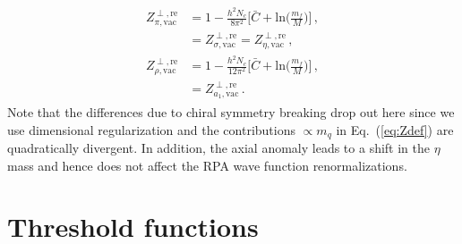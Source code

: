 \documentclass[reprint,english,superscriptaddress,preprintnumbers,amsmath,amssymb,aps,prd]{revtex4-2}
\def\Eq#1{Eq.~(\ref{#1})}
\begin{document}
%
\begin{align}
\begin{split}
Z^{\perp,\mathrm{re}}_{\pi,\mathrm{vac}}&=1-\frac{h^2N_c}{8\pi^2}\bigg[\bar{C}+\mathrm{ln}\Big(\frac{m_f}{M}\Big)\bigg]\,,\\[1ex]
&=Z^{\perp,\mathrm{re}}_{\sigma,\mathrm{vac}} = Z^{\perp,\mathrm{re}}_{\eta,\mathrm{vac}}\,,\\[2ex]
Z^{\perp,\mathrm{re}}_{\rho,\mathrm{vac}}&=1-\frac{h^2N_c}{12\pi^2}\bigg[\bar{C}+\mathrm{ln}\Big(\frac{m_f}{M}\Big)\bigg]\,,\\[1ex]
&=Z^{\perp,\mathrm{re}}_{a_1,\mathrm{vac}}\,.
\end{split}
\end{align}
%
Note that the differences due to chiral symmetry breaking drop out here since we use dimensional regularization and the contributions $\propto\! m_q$ in \Eq{eq:Zdef} are quadratically divergent. In addition, the axial anomaly leads to a shift in the $\eta$ mass and hence  does not affect the RPA wave function renormalizations.


\section{Threshold functions}\label{app:lf}
\end{document}
